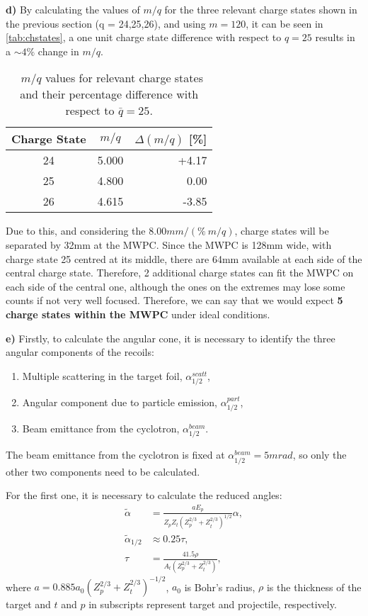 \textbf{d) } By calculating the values of $m/q$ for the three relevant charge states shown in the previous section (q = {24,25,26}), and using $m=120$, it can be seen in \autoref{tab:chstates}, a one unit charge state difference with respect to $q=25$ results in a $\sim 4\%$ change in $m/q$.

\begin{table}[H]
    \caption{\la\ $m/q$ values for relevant charge states and their percentage difference with respect to $\bar q = 25$.}
    \label{tab:chstates}
\begin{tabular}{ccr}
    \hline
    Charge State & $m/q$ & \multirow{1}{*}{$\Delta(m/q)$ [\%]}\\ \hline
    24 & 5.000 & +4.17\\
    25 & 4.800 & 0.00\\
    26 & 4.615 & -3.85\\ \hline
\end{tabular}
\end{table}

Due to this, and considering the $8.00\unit{mm/(\%\ m/q)}$, charge states will be separated by 32\unit{mm} at the MWPC. Since the MWPC is 128\unit{mm} wide, with charge state 25 centred at its middle, there are 64\unit{mm} available at each side of the central charge state. Therefore, 2 additional charge states can fit the MWPC on each side of the central one, although the ones on the extremes may lose some counts if not very well focused. Therefore, we can say that we would expect \textbf{5 charge states within the MWPC} under ideal conditions.

\textbf{e) } Firstly, to calculate the angular cone, it is necessary to identify the three angular components of the recoils:
\begin{enumerate}
    \item Multiple scattering in the target foil, $\alpha_{1/2}^{scatt}$,
    \item Angular component due to particle emission, $\alpha_{1/2}^{part}$,
    \item Beam emittance from the cyclotron, $\alpha_{1/2}^{beam}$.
\end{enumerate}

The beam emittance from the cyclotron is fixed at $\alpha_{1/2}^{beam} = 5\unit{mrad}$, so only the other two components need to be calculated. 

For the first one, it is necessary to calculate the reduced angles: 
\begin{align*}
    \label{eq:reduced}
    \tilde \alpha &= \frac{aE_p}{Z_pZ_t(Z_p^{2/3}+Z_t^{2/3})^{1/2}}\alpha, \\
    \tilde{\alpha}_{1/2} &\approx 0.25\tau,\\
    \tau &= \frac{41.5\rho}{A_t(Z_p^{2/3}+Z_t^{2/3})},
\end{align*} where $a=0.885a_0\left(Z_p^{2/3}+Z_t^{2/3}\right)^{-1/2}$, $a_0$ is Bohr's radius, $\rho$ is the thickness of the target and $t$ and $p$ in subscripts represent target and projectile, respectively.

